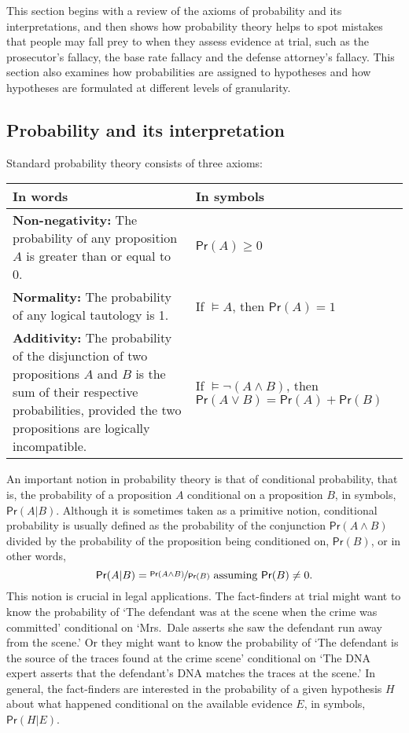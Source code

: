 \documentclass{article}
\newcommand{\pr}{\mathsf{Pr}}
\begin{document}
\label{sec:toolkit}


This section begins with a  review of the axioms of probability and its interpretations, %
and then shows how probability theory helps to spot mistakes that people may fall prey to when they assess evidence at trial, such as the prosecutor's fallacy, the base rate fallacy and the defense attorney's fallacy. 
This section also examines how probabilities are assigned to hypotheses   
and how hypotheses are formulated at different levels of granularity. 





\subsection{Probability and its interpretation}
\label{subsec:prob-int}


Standard probability theory  consists of  three axioms: 
\begin{center}
\begin{tabular}{@{}p{7cm}p{4.5cm}@{}}\toprule
 In words & In symbols \\ \midrule
\textbf{Non-negativity:}   The probability of any proposition $A$
is greater than or equal to  0. & $\pr(A)\geq 0$\\
 \textbf{Normality:}  The probability of any 
logical tautology is 1.  & If $\models A$, then $\pr(A)=1$\\
\textbf{Additivity:}   The probability of the disjunction 
of two propositions $A$ and $B$  is the sum of their 
respective probabilities, provided the two propositions are logically incompatible. 
& 
If $\models  \neg (A \wedge B)$, then \newline
$\pr(A\vee B)=\pr(A)+\pr(B)$\\ \bottomrule 
\end{tabular}
\end{center}

 An important notion in probability theory is that of conditional probability, that is, the probability of a proposition $A$ conditional on a proposition $B$, in symbols, $\pr( A\vert B)$. Although it is sometimes taken as a primitive notion, conditional probability is usually defined as the probability of the conjunction
 $\pr(A \wedge B)$ divided by the probability of the proposition being conditioned on, $\pr(B)$, or in other words,
 \[\pr(A \vert B)= \nicefrac{\pr(A \wedge B)}{\pr(B)} \text{ assuming $\pr(B)\neq 0$.} \]
 This notion is crucial in legal applications. 
The fact-finders at trial might want to know the probability of `The defendant was at the scene when the crime was committed' conditional on 
`Mrs.\ Dale asserts she saw the defendant run away from 
the scene.' Or they might want to know the probability of `The defendant is the source of the  traces found at the crime scene' conditional on `The DNA expert asserts that the defendant's DNA matches the traces at the scene.'  In general, the fact-finders are interested in the probability of a given hypothesis $H$ about what happened conditional on the available evidence $E$, in symbols, $\pr(H \vert E)$.
\end{document}
